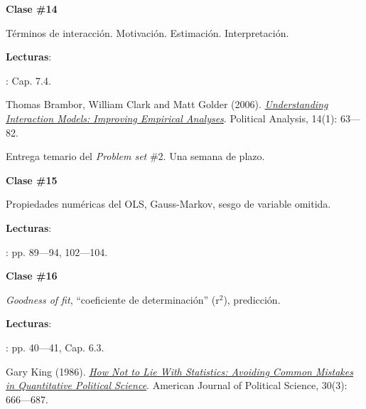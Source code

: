\documentclass[letterpaper]{article}
\renewenvironment{itemize}{
  \begin{list}{}{
    \setlength{\leftmargin}{1.5em}
  }
}{
  \end{list}
}
\begin{document}
\begin{enumerate}
			\begin{itemize} 
				\item[$\bullet$] {\bf Clase \#14}
					\begin{itemize} 
						\item[$\circ$] T\'erminos de interacci\'on. Motivaci\'on. Estimaci\'on. Interpretaci\'on.  
						\item[$\circ$] {\bf Lecturas}: 
							\begin{itemize}
								\item[$\diamond$] \textcite{Wooldridge2010}: Cap. 7.4.
								\item[$\diamond$] Thomas Brambor, William Clark and Matt Golder (2006). \href{https://github.com/hbahamonde/OLS/raw/master/Readings/Brambor_et_al.pdf}{\emph{Understanding Interaction Models: Improving Empirical Analyses}}. Political Analysis, 14(1): 63---82.
							\end{itemize}
					\end{itemize}
			\end{itemize}

\item[{\color{red}\Pointinghand}] Entrega temario del \emph{Problem set} \#2. Una semana de plazo.


			\begin{itemize} 
				\item[$\bullet$] {\bf Clase \#15}
					\begin{itemize} 
						\item[$\circ$] Propiedades num\'ericas del OLS, Gauss-Markov, sesgo de variable omitida. %
						\item[$\circ$] {\bf Lecturas}: 
							\begin{itemize} 
								\item[$\diamond$] \textcite{Wooldridge2010}: pp. 89---94, 102---104.
							\end{itemize}
					\end{itemize}
			\end{itemize}



			\begin{itemize} 
				\item[$\bullet$] {\bf Clase \#16}
					\begin{itemize} 
						\item[$\circ$] \emph{Goodness of fit}, ``coeficiente de determinaci\'on'' (r$^2$), predicci\'on. 
						\item[$\circ$] {\bf Lecturas}:
							\begin{itemize} 
								\item[$\diamond$] \textcite{Wooldridge2010}: pp. 40---41, Cap. 6.3.
								\item[$\diamond$] Gary King (1986). \href{https://github.com/hbahamonde/OLS/raw/master/Readings/King.pdf}{\emph{How Not to Lie With Statistics: Avoiding Common Mistakes in Quantitative Political Science}}. American Journal of Political Science, 30(3): 666---687.


\end{itemize}
\end{itemize}
\end{itemize}
\end{enumerate}
\end{document}
